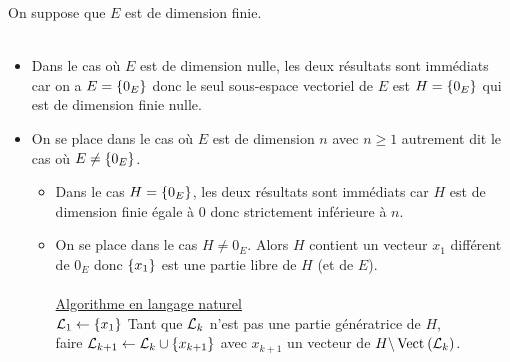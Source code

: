\begin{dem}
    On suppose que \(E\) est de dimension finie.\\~\\
    \begin{itemize}
        \item Dans le cas où \(E\) est de dimension nulle, les deux résultats sont immédiats car on a \(E = \accol{0_E }\) donc le seul sous-espace vectoriel de \(E\) est \(H = \accol{0_E }\) qui est de dimension finie nulle.
        \item On se place dans le cas où \(E\) est de dimension \(n\) avec \(n \geq 1\) autrement dit le cas où \(E\neq \accol{0_E }\).
        \begin{itemize}
            \item Dans le cas \(H = \accol{0_E }\), les deux résultats sont immédiats car \(H\) est de dimension finie égale à \(0\) donc strictement inférieure à \(n\).
            \item On se place dans le cas \(H\neq {0_E }\).
            Alors \(H\) contient un vecteur \(x_1\) différent de \(0_E\) donc \(\accol{x_1}\) est une partie libre de \(H\) (et de \(E\)).\\~\\
            \underline{Algorithme en langage naturel}\\
            \qquad \(\cal{L}_1 \leftarrow \accol{x_1}\)
            Tant que \(\cal{L}_k\) n’est pas une partie génératrice de \(H\),\\
            faire \(\cal{L}_{k+1} \leftarrow \cal{L}_k \union \accol{x_{k+1}}\) avec \(x_{k+1}\) un vecteur de \(H \pd \Vect{\cal{L}_k}\).\\~\\


\end{itemize}
\end{itemize}
\end{dem}
